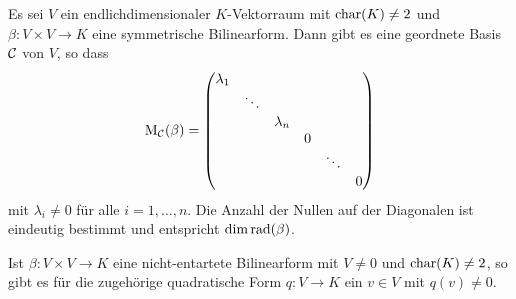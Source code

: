 \begin{theorem}\label{thrm: existence of orthogonal basis}
  Es sei $V$ ein endlichdimensionaler $K$-Vektorraum mit $\operatorname{char}(K) \neq 2$ und $\beta \colon V \times V \to K$ eine symmetrische Bilinearform.
  Dann gibt es eine geordnete Basis $\mathcal{C}$ von $V$, so dass
  \[
    \mathrm{M}_{\mathcal{C}}(\beta)
    =
    \begin{pmatrix}
      \lambda_1 &         &           &   &         &   \\
                & \ddots  &           &   &         &   \\
                &         & \lambda_n &   &         &   \\
                &         &           & 0 &         &   \\
                &         &           &   & \ddots  &   \\
                &         &           &   &         & 0
    \end{pmatrix}
  \]
  mit $\lambda_i \neq 0$ für alle $i = 1, \dotsc, n$.
  Die Anzahl der Nullen auf der Diagonalen ist eindeutig bestimmt und entspricht $\dim \operatorname{rad}(\beta)$.
\end{theorem}


\begin{lemma}
  Ist $\beta \colon V \times V \to K$ eine nicht-entartete Bilinearform mit $V \neq 0$ und $\operatorname{char}(K) \neq 2$, so gibt es für die zugehörige quadratische Form $q \colon V \to K$ ein $v \in V$ mit $q(v) \neq 0$.
\end{lemma}


